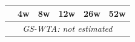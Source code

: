 \begin{tabular}{l*{5}{c}}
\toprule
 & 4w & 8w & 12w & 26w & 52w \\
\midrule
\multicolumn{6}{c}{\textit{GS-WTA: not estimated}} \\
\bottomrule
\end{tabular}
